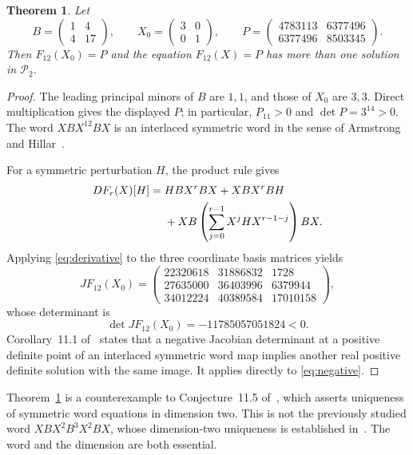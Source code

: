 \documentclass[11pt]{article}
\newtheorem{theorem}{Theorem}
\newcommand{\SPD}{\mathcal P_2}
\begin{document}
\begin{theorem}\label{thm:counter}
Let
\[
B=\begin{pmatrix}1&4\\4&17\end{pmatrix},\qquad
X_0=\begin{pmatrix}3&0\\0&1\end{pmatrix},\qquad
P=\begin{pmatrix}4783113&6377496\\6377496&8503345\end{pmatrix}.
\]
Then $F_{12}(X_0)=P$ and the equation $F_{12}(X)=P$ has more than one solution in $\SPD$.
\end{theorem}
\begin{proof}
The leading principal minors of $B$ are $1,1$, and those of $X_0$ are $3,3$. Direct multiplication gives the displayed $P$; in particular, $P_{11}>0$ and $\det P=3^{14}>0$. The word $XBX^{12}BX$ is an interlaced symmetric word in the sense of Armstrong and Hillar~\cite{AH}.

For a symmetric perturbation $H$, the product rule gives
\begin{align}
DF_r(X)[H]={}&HBX^rBX+XBX^rBH \notag\\
&+XB\left(\sum_{j=0}^{r-1}X^jHX^{r-1-j}\right)BX.\label{eq:derivative}
\end{align}
Applying \eqref{eq:derivative} to the three coordinate basis matrices yields
\[
J F_{12}(X_0)=
\begin{pmatrix}
22320618&31886832&1728\\
27635000&36403996&6379944\\
34012224&40389584&17010158
\end{pmatrix},
\]
whose determinant is
\begin{equation}\label{eq:negative}
\det JF_{12}(X_0)=-11785057051824<0.
\end{equation}
Corollary~11.1 of~\cite{AH} states that a negative Jacobian determinant at a positive definite point of an interlaced symmetric word map implies another real positive definite solution with the same image. It applies directly to \eqref{eq:negative}.
\end{proof}

Theorem~\ref{thm:counter} is a counterexample to Conjecture~11.5 of~\cite{AH}, which asserts uniqueness of symmetric word equations in dimension two. This is not the previously studied word $XBX^2B^3X^2BX$, whose dimension-two uniqueness is established in~\cite{AH,LL}. The word and the dimension are both essential.
\end{document}

